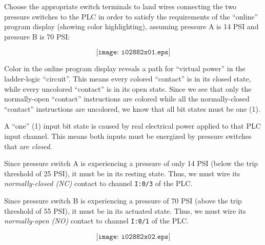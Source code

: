 

Choose the appropriate switch terminals to land wires connecting the two pressure switches to the PLC in order to satisfy the requirements of the ``online'' program display (showing color highlighting), assuming pressure A is 14 PSI and pressure B is 70 PSI:

$$\texttt{[image: i02882x01.eps]}$$







Color in the online program display reveals a path for ``virtual power'' in the ladder-logic ``circuit''.  This means every colored ``contact'' is in its closed state, while every uncolored ``contact'' is in its open state.  Since we see that only the normally-open ``contact'' instructions are colored while all the normally-closed ``contact'' instructions are uncolored, we know that all bit states must be one (1).
 
\vskip 10pt

A ``one'' (1) input bit state is caused by real electrical power applied to that PLC input channel.  This means both inputs must be energized by pressure switches that are {\it closed}.

\vskip 10pt

Since pressure switch A is experiencing a pressure of only 14 PSI (below the trip threshold of 25 PSI), it must be in its resting state.  Thus, we must wire its {\it normally-closed (NC)} contact to channel {\tt I:0/3} of the PLC.

\vskip 10pt

Since pressure switch B is experiencing a pressure of 70 PSI (above the trip threshold of 55 PSI), it must be in its actuated state.  Thus, we must wire its {\it normally-open (NO)} contact to channel {\tt I:0/1} of the PLC.

$$\texttt{[image: i02882x02.eps]}$$











